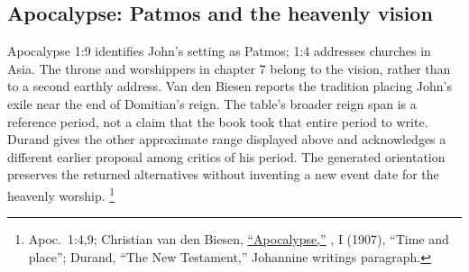 \subsection{Apocalypse: Patmos and the heavenly vision}
\label{hist-apocalypse}
Apocalypse 1:9 identifies John's setting as Patmos; 1:4 addresses
churches in Asia. The throne and worshippers in chapter 7 belong
to the vision, rather than to a second earthly address. Van den
Biesen reports the tradition placing John's exile near the end of
Domitian's reign. The table's broader reign span is a reference
period, not a claim that the book took that entire period to write.
Durand gives the other approximate range displayed above and
acknowledges a different earlier proposal among critics of his
period. The generated orientation preserves the returned alternatives
without inventing a new event date for the heavenly worship.
\footnote{Apoc.~1:4,9; Christian van den Biesen,
\href{https://www.newadvent.org/cathen/01594b.htm}{``Apocalypse,''}
, I (1907), ``Time and place'';
Durand, ``The New Testament,'' Johannine writings paragraph.}
